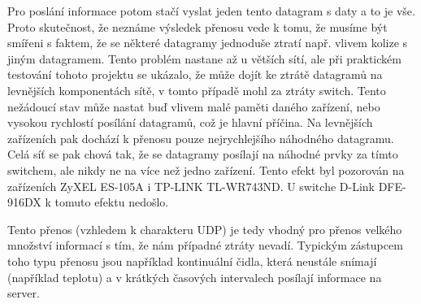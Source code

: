 Pro poslání informace potom stačí vyslat jeden tento datagram s daty a to je vše. Proto skutečnost, že neznáme výsledek přenosu vede k tomu, že musíme být smířeni s faktem, že se některé datagramy jednoduše ztratí např. vlivem kolize s jiným datagramem. Tento problém nastane až u větších sítí, ale při praktickém testování tohoto projektu se ukázalo, že může dojít ke ztrátě datagramů na levnějších komponentách sítě, v tomto případě mohl za ztráty switch. Tento nežádoucí stav může nastat buď vlivem malé paměti daného zařízení, nebo vysokou rychlostí posílání datagramů, což je hlavní příčina. Na levnějších zařízeních pak dochází k přenosu pouze nejrychlejšího náhodného datagramu. Celá síť se pak chová tak, že se datagramy posílají na náhodné prvky za tímto switchem, ale nikdy ne na více než jedno zařízení. Tento efekt byl pozorován na zařízeních ZyXEL ES-105A i TP-LINK TL-WR743ND. U switche D-Link DFE-916DX k tomuto efektu nedošlo.

Tento přenos (vzhledem k charakteru UDP) je tedy vhodný pro přenos velkého množství informací s tím, že nám případné ztráty nevadí. Typickým zástupcem toho typu přenosu jsou například kontinuální čidla, která neustále snímají (například teplotu) a v krátkých časových intervalech posílají informace na server.